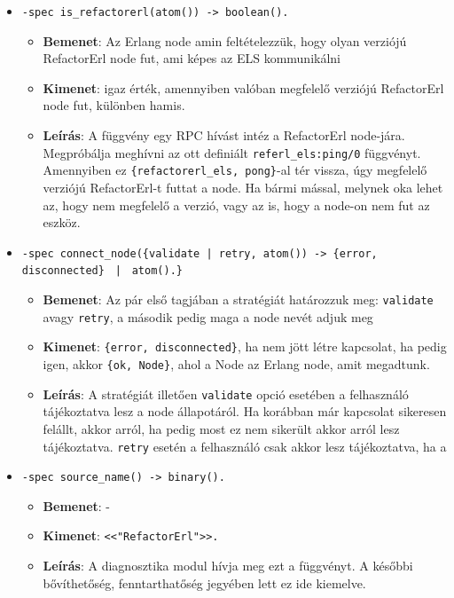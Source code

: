 \begin{itemize}
    \item \lstinline{-spec is_refactorerl(atom()) -> boolean().} 
    \begin{itemize}
            \item \textbf{Bemenet}: Az Erlang node amin feltételezzük, hogy olyan verziójú RefactorErl node fut, ami képes az ELS kommunikálni
            \item \textbf{Kimenet}: igaz érték, amennyiben valóban megfelelő verziójú RefactorErl node fut, különben hamis.
            \item \textbf{Leírás}: A függvény egy RPC hívást intéz a RefactorErl node-jára. Megpróbálja meghívni az ott definiált \lstinline{referl_els:ping/0} függvényt. Amennyiben ez \lstinline|{refactorerl_els, pong}|-al tér vissza, úgy megfelelő verziójú RefactorErl-t futtat a node. Ha bármi mással, melynek oka lehet az, hogy nem megfelelő a verzió, vagy az is, hogy a node-on nem fut az eszköz.
        \end{itemize}
    
    
        
    \item \lstinline|-spec connect_node({validate |\lstinline{| retry, atom()}\lstinline|) -> {error, disconnected} | \lstinline{|} \lstinline| atom().}| 
    \begin{itemize}
            \item \textbf{Bemenet}: Az pár első tagjában a stratégiát határozzuk meg: \lstinline{validate} avagy \lstinline{retry}, a második pedig maga a node nevét adjuk meg
            \item \textbf{Kimenet}: \lstinline|{error, disconnected}|, ha nem jött létre kapcsolat, ha pedig igen, akkor \lstinline|{ok, Node}|, ahol a Node az Erlang node, amit megadtunk.
            \item \textbf{Leírás}: A stratégiát illetően \lstinline{validate} opció esetében a felhasználó tájékoztatva lesz a node állapotáról. Ha korábban már kapcsolat sikeresen felállt, akkor arról, ha pedig most ez nem sikerült akkor arról lesz tájékoztatva. \lstinline{retry} esetén a felhasználó csak akkor lesz tájékoztatva, ha a   
        \end{itemize}
    
    
    
    \item \lstinline{-spec source_name() -> binary().}
    \begin{itemize}
            \item \textbf{Bemenet}: - 
            \item \textbf{Kimenet}: \lstinline{<<"RefactorErl">>.}
            \item \textbf{Leírás}: A diagnosztika modul hívja meg ezt a függvényt. A későbbi bővíthetőség, fenntarthatőség jegyében lett ez ide kiemelve.
        \end{itemize}
    

\end{itemize}

